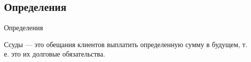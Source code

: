 \documentclass[_Venture_p3.tex]{subfiles}
\begin{document}

\subsection{Определения}
\begin{frame}[shrink=5]{Определения}
\begin{block}{Ссуды }
\quad
— это обещания клиентов выплатить определенную сумму в будущем, т. е. это их долговые обязательства.
\end{block}
\end{frame}
\end{document}
